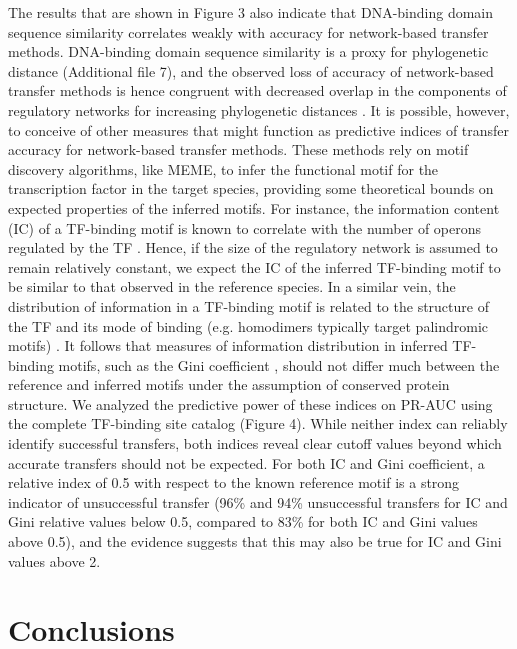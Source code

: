 The results that are shown in Figure 3 also indicate that DNA-binding domain
sequence similarity correlates weakly with accuracy for network-based transfer
methods. DNA-binding domain sequence similarity is a proxy for phylogenetic
distance (Additional file 7), and the observed loss of accuracy of
network-based transfer methods is hence congruent with decreased overlap in the
components of regulatory networks for increasing phylogenetic distances
\cite{venancio2009reconstructing, baumbach2010power, price2007orthologous}. It
is possible, however, to conceive of other measures that might function as
predictive indices of transfer accuracy for network-based transfer
methods. These methods rely on motif discovery algorithms, like MEME, to infer
the functional motif for the transcription factor in the target species,
providing some theoretical bounds on expected properties of the inferred
motifs. For instance, the information content (IC) of a TF-binding motif is
known to correlate with the number of operons regulated by the TF
\cite{schneider1986information}. Hence, if the size of the regulatory network
is assumed to remain relatively constant, we expect the IC of the inferred
TF-binding motif to be similar to that observed in the reference species. In a
similar vein, the distribution of information in a TF-binding motif is related
to the structure of the TF and its mode of binding (e.g. homodimers typically
target palindromic motifs) \cite{ravcheev2014comparative,
  gelfand1999recognition, schneider1996reading}. It follows that measures of
information distribution in inferred TF-binding motifs, such as the Gini
coefficient \cite{dorfman1979formula}, should not differ much between the
reference and inferred motifs under the assumption of conserved protein
structure. We analyzed the predictive power of these indices on PR-AUC using
the complete TF-binding site catalog (Figure 4). While neither index can
reliably identify successful transfers, both indices reveal clear cutoff values
beyond which accurate transfers should not be expected. For both IC and Gini
coefficient, a relative index of 0.5 with respect to the known reference motif
is a strong indicator of unsuccessful transfer (96\% and 94\% unsuccessful
transfers for IC and Gini relative values below 0.5, compared to 83\% for both
IC and Gini values above 0.5), and the evidence suggests that this may also be
true for IC and Gini values above 2.

\section{Conclusions}


